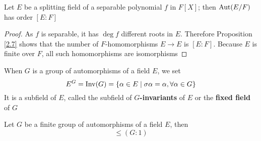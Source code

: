 \documentclass[11pt]{article}
\begin{document}
\begin{proposition}[]
\label{3.2}
Let \(E\) be a splitting field of a separable polynomial \(f\) in \(F[X]\); then \(\operatorname{\text{Aut}}(E/F)\)
has order \([E:F]\)
\end{proposition}

\begin{proof}
As \(f\) is separable, it has \(\deg f\) different roots in \(E\). Therefore Proposition \ref{2.7}
shows that the number of \(F\)-homomorphisms \(E\to E\) is \([E:F]\). Because \(E\) is finite
over \(F\), all such homomorphisms are isomorphisms
\end{proof}

When \(G\) is a group of automorphisms of a field \(E\), we set
\begin{equation*}
E^G=\operatorname{Inv}(G)=\{\alpha\in E\mid\sigma\alpha=\alpha,\forall\alpha\in G\}
\end{equation*}
It is a subfield of \(E\), called the subfield of \textbf{\(G\)-invariants} of \(E\) or the \textbf{fixed field}
of \(G\)

\begin{theorem}[E. Artin]
\label{3.4}
Let \(G\) be a finite group of automorphisms of a field \(E\), then
\begin{equation*}
[E:E^G]\le(G:1)
\end{equation*}
\end{theorem}
\end{document}
